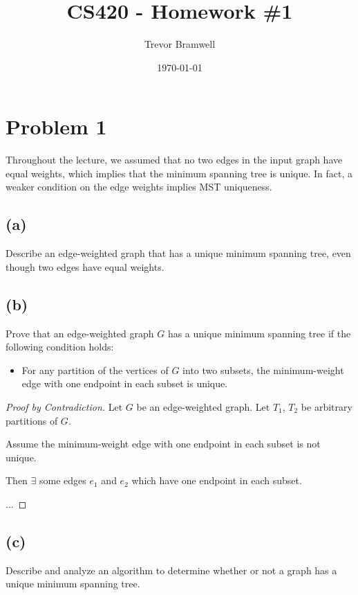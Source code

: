 \documentclass[12pt]{article}
\title{CS420 - Homework \#1}
\author{Trevor Bramwell}
\date{\today}
\begin{document}
\maketitle

\section*{Problem 1}

Throughout the lecture, we assumed that no two edges in the input graph
have equal weights, which implies that the minimum spanning tree is
unique. In fact, a weaker condition on the edge weights implies MST
uniqueness.

\subsection*{(a)}
Describe an edge-weighted graph that has a unique minimum spanning tree,
even though two edges have equal weights.

\begin{center}
\end{center}

\subsection*{(b)}
Prove that an edge-weighted graph $G$ has a unique minimum spanning tree
if the following condition holds:

\begin{itemize}
    \item For any partition of the vertices of $G$ into two subsets, the
          minimum-weight edge with one endpoint in each subset is unique.
\end{itemize}

\begin{proof}[Proof by Contradiction]
    Let $G$ be an edge-weighted graph. Let $T_1$, $T_2$ be arbitrary
    partitions of $G$.
    
    Assume the minimum-weight edge with one endpoint in each subset is
    not unique.

    Then $\exists$ some edges $e_1$ and $e_2$ which have one endpoint in each
    subset.

    $\ldots$

\end{proof}

\subsection*{(c)}
Describe and analyze an algorithm to determine whether or not a graph
has a unique minimum spanning tree.
\end{document}
